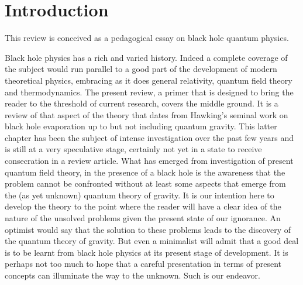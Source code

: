 \documentclass[12pt,oneside]{report}
\begin{document}
\section*{Introduction}
\par This review is conceived as a pedagogical essay on black hole quantum
physics.
\par Black hole physics has a rich and varied history. Indeed a
 complete coverage of the subject would run parallel to a good part of the
development
of modern theoretical physics, embracing as it does general
relativity, quantum field theory and thermodynamics. The present review, a
primer that is
designed to bring the reader to the threshold of current research, covers
the middle ground.
It is a review of that aspect of the theory that dates from Hawking's seminal
 work on black hole evaporation up to but not including quantum gravity.
This latter
chapter has been the subject of intense investigation over the past few years
 and is still at a very speculative stage, certainly not yet in a 
state to receive consecration in a review article. What has emerged from
investigation
of present quantum field theory, in the presence of a black hole is the
awareness
that the problem cannot be confronted without at least some aspects that
emerge from the
(as yet unknown) quantum theory of gravity. It is our intention here to
develop the 
theory to the point where the reader will have a clear idea 
of the nature of the unsolved problems given the present state of our
ignorance. An optimist
would say that the solution to these problems leads to the discovery 
of the quantum theory of gravity. But even a minimalist will admit that a
good deal is to
 be learnt from black hole physics 
at its present stage of development. It is perhaps not too
much to hope that a careful presentation in terms 
of present concepts can illuminate the way to the unknown. Such is our endeavor.
\end{document}
